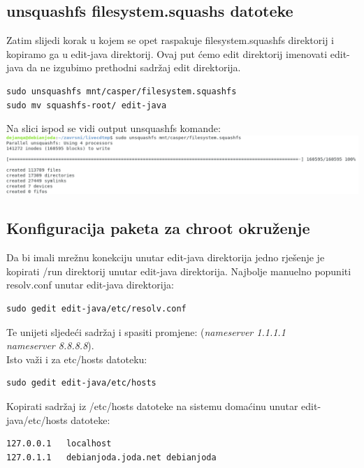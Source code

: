 \documentclass[12pt,vi]{mitthesis}
\begin{document}
\subsection*{unsquashfs filesystem.squashs datoteke}
\indent
Zatim slijedi korak u kojem se opet raspakuje filesystem.squashfs direktorij i kopiramo ga u edit-java direktorij. Ovaj put ćemo edit direktorij imenovati edit-java da ne izgubimo prethodni sadržaj edit direktorija.\\
\begin{lstlisting}[style=BashInputStyle]
sudo unsquashfs mnt/casper/filesystem.squashfs
sudo mv squashfs-root/ edit-java
\end{lstlisting}
Na slici ispod se vidi output unsquashfs komande:\\
\includegraphics[width=\linewidth]{images/unsquashfscommand.png} 

\subsection*{Konfiguracija paketa za chroot okruženje}
\noindent
Da bi imali mrežnu konekciju unutar edit-java direktorija jedno rješenje je kopirati /run direktorij unutar edit-java direktorija.
Najbolje manuelno popuniti resolv.conf unutar edit-java direktorija:
\begin{lstlisting}[style=BashInputStyle]
sudo gedit edit-java/etc/resolv.conf
\end{lstlisting}
Te unijeti sljedeći sadržaj i spasiti promjene:
(\textit{nameserver 1.1.1.1 \\
nameserver 8.8.8.8}).\\
\noindent
Isto važi i za etc/hosts datoteku:
\begin{lstlisting}[style=BashInputStyle]
sudo gedit edit-java/etc/hosts
\end{lstlisting}
Kopirati sadržaj iz /etc/hosts datoteke na sistemu domaćinu unutar edit-java/etc/hosts datoteke:
\begin{lstlisting}
127.0.0.1	localhost
127.0.1.1	debianjoda.joda.net	debianjoda
\end{lstlisting}
\end{document}
